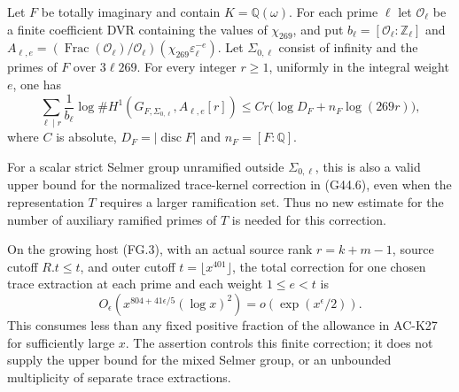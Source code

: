 \begin{corollary}
\label{AC-G44-budget}
Let $F$ be totally imaginary and contain $K=\mathbb Q(\omega)$.
For each prime $\ell$ let $\mathcal O_\ell$ be a finite coefficient
DVR containing the values of $\chi_{269}$, and put
$b_\ell=[\mathcal O_\ell:\mathbb Z_\ell]$ and
$A_{\ell,e}=(\operatorname{Frac}(\mathcal O_\ell)/
\mathcal O_\ell)(\chi_{269}\varepsilon_\ell^{-e})$.
Let $\Sigma_{0,\ell}$ consist of infinity and the primes of
$F$ over $3\ell269$.  For every integer $r\ge1$, uniformly
in the integral weight $e$, one has
\[
 \sum_{\ell\mid r}\frac1{b_\ell}
  \log\#H^1(G_{F,\Sigma_{0,\ell}},A_{\ell,e}[r])
 \le C r\bigl(\log D_F+n_F\log(269r)\bigr),             \tag{G44.11}
\]
where $C$ is absolute, $D_F=|\operatorname{disc}F|$ and
$n_F=[F:\mathbb Q]$.

For a scalar strict Selmer group unramified outside
$\Sigma_{0,\ell}$, this is also a valid upper bound for
the normalized trace-kernel correction in (G44.6), even
when the representation $T$ requires a larger ramification
set.  Thus no new estimate for the number of auxiliary
ramified primes of $T$ is needed for this correction.

On the growing host (FG.3), with an actual source rank
$r=k+m-1$, source cutoff $R.t\le t$, and outer cutoff
$t=\lfloor x^{401}\rfloor$, the total correction
for one chosen trace extraction at each prime and each weight
$1\le e<t$ is
\[
 O_\epsilon\!\left(x^{804+41\epsilon/5}(\log x)^2\right)
                 =o\!\left(\exp(x^\epsilon/2)\right).   \tag{G44.12}
\]
This consumes less than any fixed positive fraction of the
allowance in AC-K27 for sufficiently large $x$.
The assertion controls this finite correction; it does not
supply the upper bound for the mixed Selmer group, or an
unbounded multiplicity of separate trace extractions.
\end{corollary}
